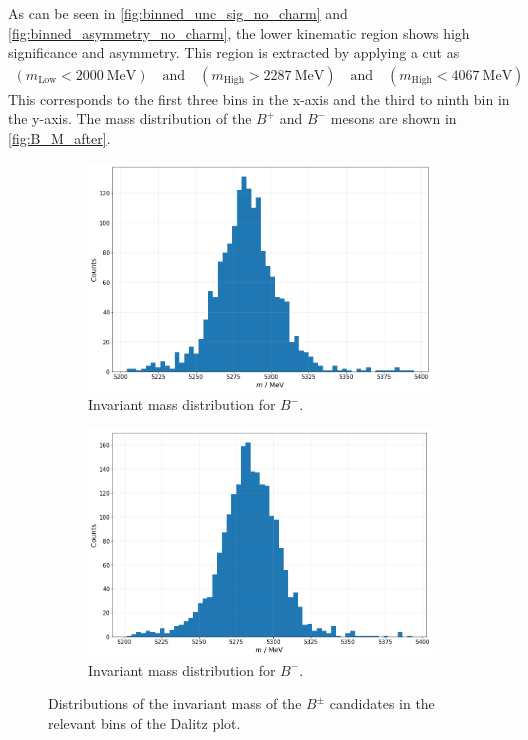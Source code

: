 As can be seen in \autoref{fig:binned_unc_sig_no_charm} and \autoref{fig:binned_asymmetry_no_charm}, the lower kinematic region shows high significance and asymmetry. This region is extracted by applying a cut as 
\begin{align*}
  (m_{\mathrm{Low}} < \qty{2000}{\mega\electronvolt}) \quad \mathrm{and} \quad (m_{\mathrm{High}} > \qty{2287}{\mega\electronvolt}) \quad \mathrm{and} \quad (m_{\mathrm{High}} < \qty{4067}{\mega\electronvolt})
\end{align*}
This corresponds to the first three bins in the x-axis and the third to ninth bin in the y-axis. The mass distribution of the $B^+$ and $B^-$ mesons are shown in \autoref{fig:B_M_after}. 
\begin{figure}
  \centering
  \begin{subfigure}[b]{0.45\textwidth}
      \centering
      \includegraphics[width=\textwidth]{"content/pics/B_M_real_after_m.png"}
      \caption{Invariant mass distribution for $B^-$.}
  \end{subfigure}
  \hfill
  \begin{subfigure}[b]{0.45\textwidth}
      \centering
      \includegraphics[width=\textwidth]{"content/pics/B_M_real_after_p.png"}
      \caption{Invariant mass distribution for $B^-$.}
  \end{subfigure}
     \caption{Distributions of the invariant mass of the $B^\pm$ candidates in the relevant bins of the Dalitz plot.}
     \label{fig:B_M_after}
\end{figure}
